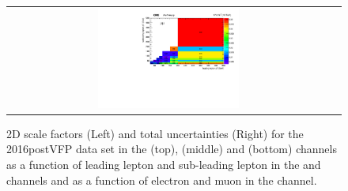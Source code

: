 \begin{figure}[!htb]
\begin{center}
\begin{tabular}{cc}
      \includegraphics[width=0.45\textwidth]{fig_2016postVFP_TrigSF/h2D_lepABpt_mumu_BinErrors.pdf}\\
    \end{tabular}
    \caption{2D scale factors (Left) and total uncertainties (Right) for the 2016postVFP data set in the \emu (top), \ee (middle) and \mumu (bottom) channels as a function of leading lepton \pT and sub-leading lepton \pT in the \ee and \mumu channels and as a function of electron \pT and muon \pT in the \emu channel.}
    \label{TrigSF_2016postVFP_4}
  \end{center}
\end{figure}

